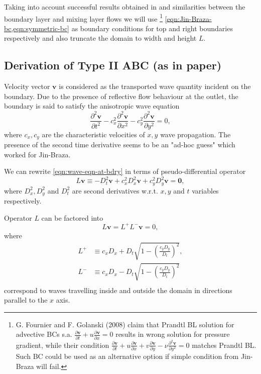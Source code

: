 \documentclass{article}
\numberwithin{equation}{section}
\begin{document}
Taking into account successful results obtained in \cite{Kourta:1987, Jin:1993, Persillon:1998} and similarities between the boundary layer and mixing layer flows we will use
\footnote{G. Fournier and F. Golanski (2008) claim that Prandtl BL solution for advective BCs s.a. $\frac{\partial \boldsymbol{v}}{\partial t} + u\frac{\partial \boldsymbol{v}}{\partial x}=0$ results in wrong solution for pressure gradient, while their condition $\frac{\partial \boldsymbol{v}}{\partial t}+u \frac{\partial \boldsymbol{v}}{\partial x}+v \frac{\partial \boldsymbol{v}}{\partial y}-\nu \frac{\partial^2 \boldsymbol{v}}{\partial y^2}=0$ matches Prandtl BL. Such BC could be used as an alternative option if simple condition from Jin-Braza\cite{Jin:1993} will fail.} 
\cref{eqn:Jin-Braza-bc,eqn:symmetric-bc} as boundary conditions for top and right boundaries respectively and also truncate the domain to width and height $L$.

\subsection{Derivation of Type II ABC (as in paper)}\label{subsec:non-reflecting-abc}
Velocity vector $\boldsymbol{v}$ is considered as the transported wave quantity incident on the boundary. 
Due to the presence of reflective flow behaviour at the outlet, the boundary is said to satisfy the anisotropic wave equation
\begin{equation}\label{eqn:wave-eqn-at-bdry}
	\frac{\partial ^2 \boldsymbol{v}}{\partial t^2}-c_x^2\frac{\partial ^2 \boldsymbol{v}}{\partial x^2}-c_y^2\frac{\partial ^2 \boldsymbol{v}}{\partial y^2}=0,
\end{equation}
where $c_x,c_y$ are the characteristic velocities of $x,y$ wave propagation. The presence of the second time derivative seems to be an "ad-hoc guess" which worked for Jin-Braza\cite{Jin:1993}. 

We can rewrite \cref{eqn:wave-eqn-at-bdry} in terms of pseudo-differential operator
\begin{equation*}
	L\boldsymbol{v}\equiv -D_t^2\boldsymbol{v}+c_x^2D_x^2\boldsymbol{v}+c_y^2D_y^2\boldsymbol{v=0},
\end{equation*}
where $D^2_x,D^2_y$ and $D^2_t$ are second derivatives w.r.t. $x,y$ and $t$ variables respectively. 

Operator $L$ can be factored into
\begin{equation*}
	L\boldsymbol{v}=L^+L^-\boldsymbol{v}=0,
\end{equation*}
where
\begin{align*}
	L^+&\equiv c_x D_x + D_t\sqrt{1-\left( \frac{c_y D_y}{D_t}\right)^2},\\
	L^-&\equiv c_x D_x - D_t\sqrt{1-\left( \frac{c_y D_y}{D_t}\right)^2}\\
\end{align*}
correspond to waves travelling inside and outside the domain in directions parallel to the $x$ axis. 
\end{document}
